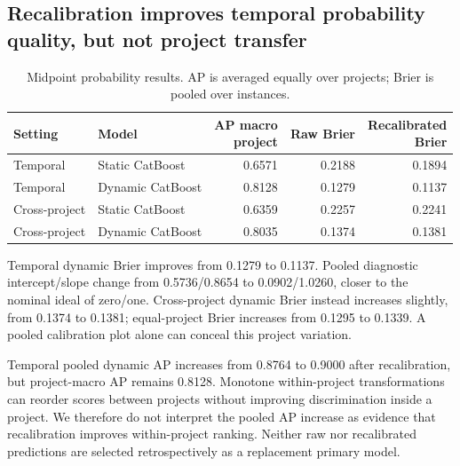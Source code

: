 \documentclass[11pt,a4paper]{article}
\begin{document}
\subsection{Recalibration improves temporal probability quality, but not project transfer}\label{recalibration-improves-temporal-probability-quality-but-not-project-transfer}

{\def\LTcaptype{table}
\begin{table}[htbp]
\centering\footnotesize\setlength{\tabcolsep}{4pt}
\caption{Midpoint probability results. AP is averaged equally over projects; Brier is pooled over instances.}\label{tab:04_probability}
\begin{tabular}{@{}llrrr@{}}
\toprule
Setting & Model & \shortstack{AP macro\\project} & Raw Brier & \shortstack{Recalibrated\\Brier} \\
\midrule
Temporal & Static CatBoost & 0.6571 & 0.2188 & 0.1894 \\
Temporal & Dynamic CatBoost & 0.8128 & 0.1279 & 0.1137 \\
Cross-project & Static CatBoost & 0.6359 & 0.2257 & 0.2241 \\
Cross-project & Dynamic CatBoost & 0.8035 & 0.1374 & 0.1381 \\
\bottomrule
\end{tabular}
\end{table}

}

Temporal dynamic Brier improves from 0.1279 to 0.1137. Pooled diagnostic intercept/slope change from 0.5736/0.8654 to 0.0902/1.0260, closer to the nominal ideal of zero/one. Cross-project dynamic Brier instead increases slightly, from 0.1374 to 0.1381; equal-project Brier increases from 0.1295 to 0.1339. A pooled calibration plot alone can conceal this project variation.

Temporal pooled dynamic AP increases from 0.8764 to 0.9000 after recalibration, but project-macro AP remains 0.8128. Monotone within-project transformations can reorder scores between projects without improving discrimination inside a project. We therefore do not interpret the pooled AP increase as evidence that recalibration improves within-project ranking. Neither raw nor recalibrated predictions are selected retrospectively as a replacement primary model.
\end{document}
